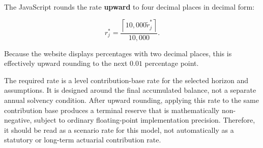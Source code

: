 The JavaScript rounds the rate \textbf{upward} to four decimal places in decimal form:

\begin{equation}
r_j^{\ast}=\frac{\left\lceil 10{,}000\widetilde{r}_j^{\ast}\right\rceil}{10{,}000}.
\end{equation}

Because the website displays percentages with two decimal places, this is effectively upward rounding to the next $0.01$ percentage point.

\begin{interpretation}
The required rate is a level contribution-base rate for the selected horizon and assumptions. It is designed around the final accumulated balance, not a separate annual solvency condition. After upward rounding, applying this rate to the same contribution base produces a terminal reserve that is mathematically non-negative, subject to ordinary floating-point implementation precision. Therefore, it should be read as a scenario rate for this model, not automatically as a statutory or long-term actuarial contribution rate.
\end{interpretation}
